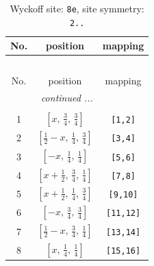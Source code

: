 \documentclass[fleqn,8pt]{jsarticle}
\begin{document}
\begin{longtable}{ccc}
\caption{Wyckoff site: {\tt 8e}, site symmetry: {\tt 2..}}
 \\
 \hline \hline
No. & position & mapping \\ \hline \endfirsthead

\multicolumn{2}{l}{\tablename\ \thetable{}} \\
 \hline \hline
No. & position & mapping \\ \hline \endhead

 \hline \hline
\multicolumn{2}{r}{\footnotesize\it continued ...} \\ \endfoot

 \hline \hline
\multicolumn{2}{r}{} \\ \endlastfoot

1 & $\left[ x,\, \frac{3}{4},\, \frac{3}{4} \right]$ & {\tt [1,2]} \\ \hline
2 & $\left[ \frac{1}{2} - x,\, \frac{1}{4},\, \frac{3}{4} \right]$ & {\tt [3,4]} \\ \hline
3 & $\left[ - x,\, \frac{1}{4},\, \frac{1}{4} \right]$ & {\tt [5,6]} \\ \hline
4 & $\left[ x + \frac{1}{2},\, \frac{3}{4},\, \frac{1}{4} \right]$ & {\tt [7,8]} \\ \hline
5 & $\left[ x + \frac{1}{2},\, \frac{1}{4},\, \frac{3}{4} \right]$ & {\tt [9,10]} \\ \hline
6 & $\left[ - x,\, \frac{3}{4},\, \frac{3}{4} \right]$ & {\tt [11,12]} \\ \hline
7 & $\left[ \frac{1}{2} - x,\, \frac{3}{4},\, \frac{1}{4} \right]$ & {\tt [13,14]} \\ \hline
8 & $\left[ x,\, \frac{1}{4},\, \frac{1}{4} \right]$ & {\tt [15,16]} \\
\end{longtable}
\renewcommand{\arraystretch}{1.2}
\end{document}
